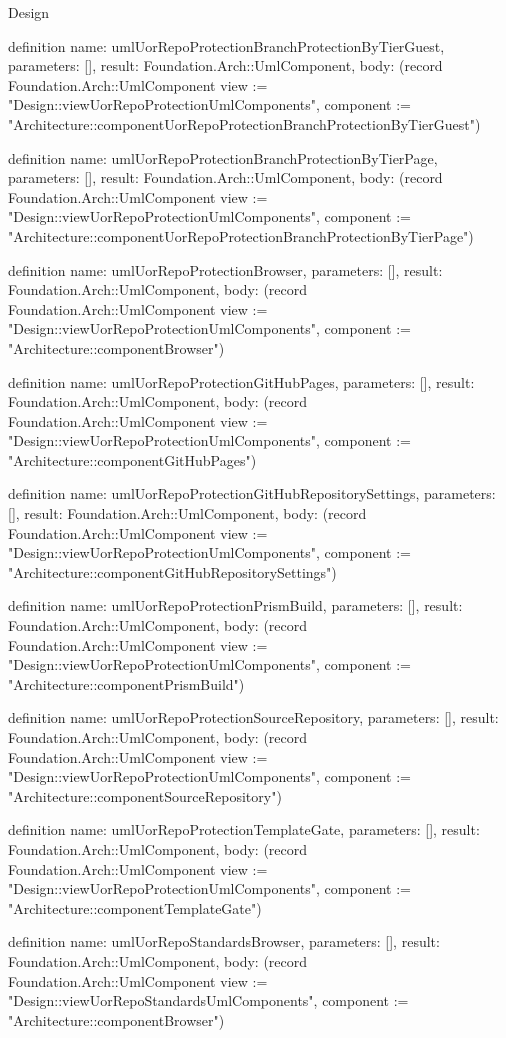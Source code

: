 \begin{lexlean}{Design}
\begin{semanticmodule}
definition{
  name: umlUorRepoProtectionBranchProtectionByTierGuest,
  parameters: [],
  result: Foundation.Arch::UmlComponent,
  body: (record Foundation.Arch::UmlComponent {view := "Design::viewUorRepoProtectionUmlComponents", component := "Architecture::componentUorRepoProtectionBranchProtectionByTierGuest"})
}

definition{
  name: umlUorRepoProtectionBranchProtectionByTierPage,
  parameters: [],
  result: Foundation.Arch::UmlComponent,
  body: (record Foundation.Arch::UmlComponent {view := "Design::viewUorRepoProtectionUmlComponents", component := "Architecture::componentUorRepoProtectionBranchProtectionByTierPage"})
}

definition{
  name: umlUorRepoProtectionBrowser,
  parameters: [],
  result: Foundation.Arch::UmlComponent,
  body: (record Foundation.Arch::UmlComponent {view := "Design::viewUorRepoProtectionUmlComponents", component := "Architecture::componentBrowser"})
}

definition{
  name: umlUorRepoProtectionGitHubPages,
  parameters: [],
  result: Foundation.Arch::UmlComponent,
  body: (record Foundation.Arch::UmlComponent {view := "Design::viewUorRepoProtectionUmlComponents", component := "Architecture::componentGitHubPages"})
}

definition{
  name: umlUorRepoProtectionGitHubRepositorySettings,
  parameters: [],
  result: Foundation.Arch::UmlComponent,
  body: (record Foundation.Arch::UmlComponent {view := "Design::viewUorRepoProtectionUmlComponents", component := "Architecture::componentGitHubRepositorySettings"})
}

definition{
  name: umlUorRepoProtectionPrismBuild,
  parameters: [],
  result: Foundation.Arch::UmlComponent,
  body: (record Foundation.Arch::UmlComponent {view := "Design::viewUorRepoProtectionUmlComponents", component := "Architecture::componentPrismBuild"})
}

definition{
  name: umlUorRepoProtectionSourceRepository,
  parameters: [],
  result: Foundation.Arch::UmlComponent,
  body: (record Foundation.Arch::UmlComponent {view := "Design::viewUorRepoProtectionUmlComponents", component := "Architecture::componentSourceRepository"})
}

definition{
  name: umlUorRepoProtectionTemplateGate,
  parameters: [],
  result: Foundation.Arch::UmlComponent,
  body: (record Foundation.Arch::UmlComponent {view := "Design::viewUorRepoProtectionUmlComponents", component := "Architecture::componentTemplateGate"})
}

definition{
  name: umlUorRepoStandardsBrowser,
  parameters: [],
  result: Foundation.Arch::UmlComponent,
  body: (record Foundation.Arch::UmlComponent {view := "Design::viewUorRepoStandardsUmlComponents", component := "Architecture::componentBrowser"})
}


\end{semanticmodule}
\end{lexlean}
